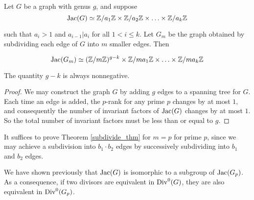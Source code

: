 \documentclass{amsart}
\begin{document}
\begin{thm}
  \label{subdivide_thm}
  Let $G$ be a graph with genus $g$, and suppose
  \begin{equation}
    \operatorname{Jac}(G) \simeq \mathbb{Z}/a_1\mathbb{Z} \times \mathbb{Z}/a_2\mathbb{Z} \times \ldots \times \mathbb{Z}/a_k\mathbb{Z}
  \end{equation}

  such that $a_i > 1$ and $a_{i-1} | a_i$ for all $1 < i \le k$. Let
  $G_m$ be the graph obtained by subdividing each edge of $G$ into $m$
  smaller edges. Then

  \begin{equation}
    \operatorname{Jac}(G_m) \simeq (\mathbb{Z}/m\mathbb{Z})^{g-k} 
    \times \mathbb{Z}/ma_1\mathbb{Z} \times \ldots \times \mathbb{Z}/ma_k\mathbb{Z}
  \end{equation}

\end{thm}

\begin{prop}
  The quantity $g - k$ is always nonnegative.
\end{prop}
\begin{proof}
  We may construct the graph $G$ by adding $g$ edges to a spanning
  tree for $G$. Each time an edge is added, the $p$-rank for any prime
  $p$ changes by at most $1$, and consequently the number of invariant
  factors of $\operatorname{Jac}(G)$ changes by at most $1$. So the total number of
  invariant factors must be less than or equal to $g$.
\end{proof}

It suffices to prove Theorem \ref{subdivide_thm} for $m=p$ for prime
$p$, since we may achieve a subdivision into $b_1 \cdot b_2$ edges by
successively subdividing into $b_1$ and $b_2$ edges.

We have shown previously that $\operatorname{Jac}(G)$ is isomorphic to a subgroup of
$\operatorname{Jac}(G_p)$. As a consequence, if two divisors are equivalent in
$\operatorname{Div}^0(G)$, they are also equivalent in $\operatorname{Div}^0(G_p)$.
\end{document}
